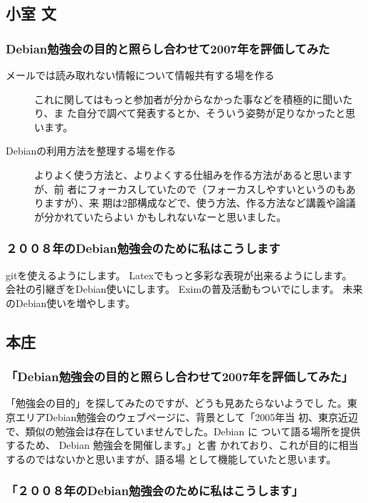 \documentclass[mingoth,a4paper]{jsarticle}
\begin{document}
\subsection{小室 文}
\subsubsection{Debian勉強会の目的と照らし合わせて2007年を評価してみた}

\begin{description}
 \item[メールでは読み取れない情報について情報共有する場を作る]
これに関してはもっと参加者が分からなかった事などを積極的に聞いたり、ま
 た自分で調べて発表するとか、そういう姿勢が足りなかったと思います。

 \item[Debianの利用方法を整理する場を作る]
 よりよく使う方法と、よりよくする仕組みを作る方法があると思いますが、前
 者にフォーカスしていたので（フォーカスしやすいというのもありますが）、来
 期は2部構成などで、使う方法、作る方法など講義や論議が分かれていたらよい
 かもしれないなーと思いました。
\end{description}

\subsubsection{２００８年のDebian勉強会のために私はこうします}

gitを使えるようにします。
Latexでもっと多彩な表現が出来るようにします。
会社の引継ぎをDebian使いにします。
Eximの普及活動もついでにします。
未来のDebian使いを増やします。

\subsection{本庄}

\subsubsection{「Debian勉強会の目的と照らし合わせて2007年を評価してみた」}

「勉強会の目的」を探してみたのですが、どうも見あたらないようでし
た。東京エリアDebian勉強会のウェブページに、背景として「2005年当
初、東京近辺で、類似の勉強会は存在していませんでした。Debian に
ついて語る場所を提供するため、 Debian 勉強会を開催します。」と書
かれており、これが目的に相当するのではないかと思いますが、語る場
として機能していたと思います。

\subsubsection{「２００８年のDebian勉強会のために私はこうします」}
\end{document}
